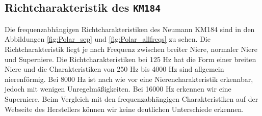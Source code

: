 \subsection{Richtcharakteristik des \texttt{KM184}}
\label{subsec:d}
Die frequenzabhängigen Richtcharakteristiken des Neumann KM184 sind in den Abbildungen \ref{fig:Polar_sep} und \ref{fig:Polar_allfreqs} zu sehen.
Die Richtcharakteristik liegt je nach Frequenz zwischen breiter Niere, normaler Niere und Superniere. 
Die Richtcharakteristiken bei 125 Hz hat die Form einer breiten Niere und die Charakteristiken von 250 Hz bis 4000 Hz sind allgemein nierenförmig.
Bei 8000 Hz ist nach wie vor eine Nierencharakteristik erkennbar, jedoch mit wenigen Unregelmäßigkeiten.
Bei 16000 Hz erkennen wir eine Superniere.
Beim Vergleich mit den frequenzabhängigen Charakteristiken auf der Webseite des Herstellers \cite{KM184} können wir keine deutlichen Unterschiede erkennen.

